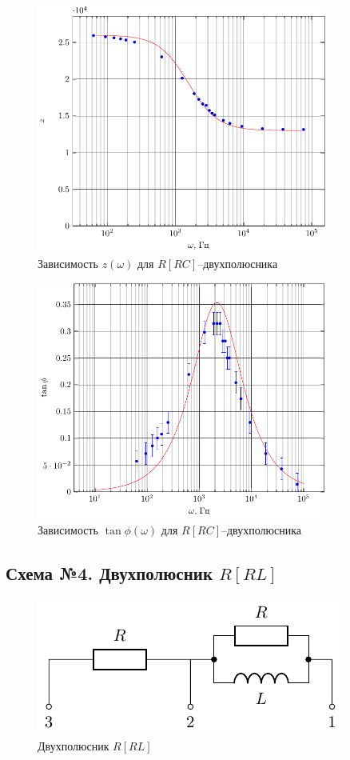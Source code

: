 
\begin{figure}[H]
	\centering
	\includegraphics[width=0.85\textwidth]{img/chem3_z}
	\caption{Зависимость $z(\omega)$ для  $R[RC]$--двухполюсника}
	\label{fig:RRC_z}
\end{figure}
\begin{figure}[H]
	\centering
	\includegraphics[width=0.85\textwidth]{img/chem3_phi} 
	\caption{Зависимость $\tan\phi(\omega)$ для $R[RC]$--двухполюсника}
	\label{fig:RRC_tanphi}
\end{figure}


\subsection{Схема №4. Двухполюсник $R[RL]$}
\begin{figure}[H]
	\centering
	\includegraphics[]{chems/chem4}
	\caption{Двухполюсник $R[RL]$}
	\label{fig:RRL}
\end{figure}
